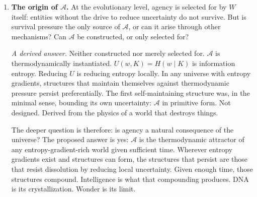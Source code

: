 \documentclass[
]{article}
\begin{document}
\begin{enumerate}
\def\labelenumi{\arabic{enumi}.}
\item
  \textbf{The origin of \(\mathcal{A}\).} At the evolutionary level,
  agency is selected for by \(W\) itself: entities without the drive to
  reduce uncertainty do not survive. But is survival pressure the only
  source of \(\mathcal{A}\), or can it arise through other mechanisms?
  Can \(\mathcal{A}\) be constructed, or only selected for?

  \emph{A derived answer.} Neither constructed nor merely selected for.
  \(\mathcal{A}\) is thermodynamically instantiated.
  \(U(w, K) = H(w \mid K)\) is information entropy. Reducing \(U\) is
  reducing entropy locally. In any universe with entropy gradients,
  structures that maintain themselves against thermodynamic pressure
  persist preferentially. The first self-maintaining structure was, in
  the minimal sense, bounding its own uncertainty: \(\mathcal{A}\) in
  primitive form. Not designed. Derived from the physics of a world that
  destroys things.

  The deeper question is therefore: is agency a natural consequence of
  the universe? The proposed answer is yes: \(\mathcal{A}\) is the
  thermodynamic attractor of any entropy-gradient-rich world given
  sufficient time. Wherever entropy gradients exist and structures can
  form, the structures that persist are those that resist dissolution by
  reducing local uncertainty. Given enough time, those structures
  compound. Intelligence is what that compounding produces. DNA is its
  crystallization. Wonder is its limit.


\end{enumerate}
\end{document}
